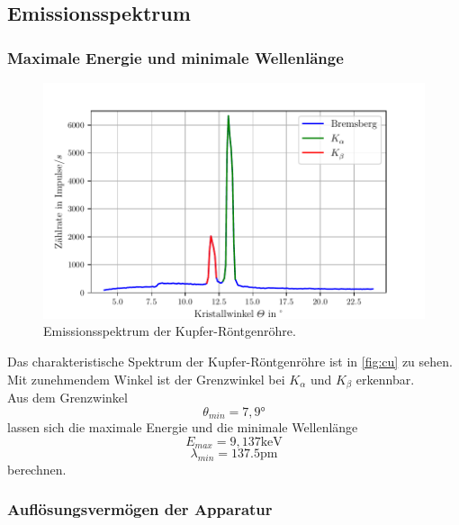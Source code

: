 \subsection{Emissionsspektrum}
\label{subsec:emissionsspektrum}


\subsubsection*{Maximale Energie und minimale Wellenlänge}

\begin{figure}
  \centering
  \includegraphics{build/plot_cu.pdf}
  \caption{Emissionsspektrum der Kupfer-Röntgenröhre.}
  \label{fig:cu}
\end{figure}


Das charakteristische Spektrum der Kupfer-Röntgenröhre ist in \autoref{fig:cu} zu sehen.\\
Mit zunehmendem Winkel ist der Grenzwinkel bei  $K_{\alpha}$ und $K_{\beta}$ erkennbar. \\ 
Aus dem Grenzwinkel 
\begin{equation*}
  \theta_{min} = 7,9°
\end{equation*}
lassen sich die maximale Energie und die minimale Wellenlänge 
\begin{equation*}
  E_{max} = 9,137 \mathrm{keV}
\end{equation*}
\begin{equation*}
  \lambda_{min} = 137.5 \si{\pico\m}
\end{equation*} 
berechnen.


\subsubsection*{Auflösungsvermögen der Apparatur}

